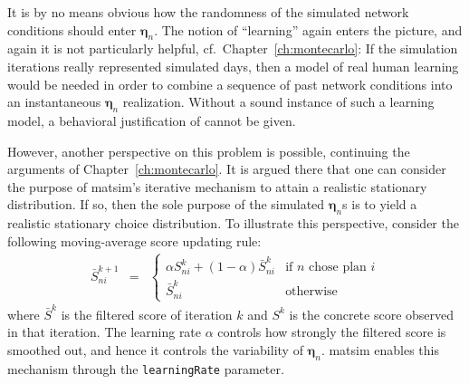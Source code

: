 %
It is by no means obvious how the randomness of the simulated network conditions 
should enter $\boldsymbol{\eta}_n$.
%
%
The notion of {}``learning'' again
enters the picture, and again it is not particularly helpful, cf.~Chapter~\ref{ch:montecarlo}: If the simulation iterations really represented
simulated days, then a model of real human learning would be needed in
order to combine a sequence of past network conditions into an instantaneous
$\boldsymbol{\eta}_n$ realization. Without a sound instance of such a learning model,
a behavioral justification of  cannot
be given.

However, another perspective on this problem is possible, continuing
the arguments of Chapter~\ref{ch:montecarlo}. It is argued there that one can consider
the 
purpose of \gls{matsim}'s iterative mechanism to attain a realistic
stationary distribution. If so, then the sole purpose of the simulated
$\boldsymbol{\eta}_n$s is to yield a realistic stationary choice distribution. To
illustrate this perspective, consider the following moving-average score
updating rule:
\begin{eqnarray}
\bar{S}_{ni}^{k+1} & = & \begin{cases}
\alpha S_{ni}^{k} + (1 - \alpha)\bar{S}_{ni}^{k} & \text{if }n\text{ chose plan }i\\
\bar{S}_{ni}^{k} & \text{otherwise}
\end{cases}
\end{eqnarray}
where $\bar{S}^{k}$ is the filtered score of iteration $k$ and $S^{k}$
is the concrete score observed in that iteration. The learning rate $\alpha$
controls how strongly the filtered score is smoothed out, and hence
it controls the variability of $\boldsymbol{\eta}_n$. \gls{matsim} enables this mechanism
through the \lstinline{learningRate} parameter.

